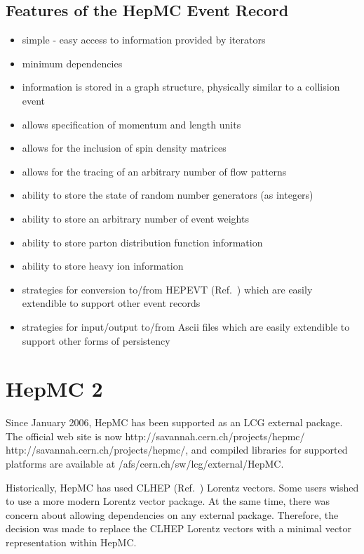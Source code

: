 \documentclass[11pt,letterpaper]{article}
\begin{document}
%
%

\subsection{Features of the HepMC Event Record}

\begin{itemize}\setlength{\itemsep}{0pt}
\item simple - easy access to information provided by iterators
\item minimum dependencies
\item information is stored in a graph structure, 
  physically similar to a collision event
\item allows specification of momentum and length units
\item allows for the inclusion of spin density matrices 
\item allows for the tracing of an arbitrary number of flow patterns
\item ability to store the state of random number generators (as
  integers)
\item ability to store an arbitrary number of event weights
\item ability to store parton distribution function information
\item ability to store heavy ion information 
\item strategies for conversion to/from HEPEVT (Ref.~\cite{Boos:2001cv}) 
  which are easily extendible to support other event records
\item strategies for input/output to/from Ascii files which
  are easily extendible to support other forms of persistency
\end{itemize}

%
%

\section{HepMC 2}

Since January 2006, HepMC has been supported as an LCG external package.
The official web site is now \htmladdnormallink 
{http://savannah.cern.ch/projects/hepmc/} 
{http://savannah.cern.ch/projects/hepmc/}, 
and compiled libraries for supported platforms are available at 
/afs/cern.ch/sw/lcg/external/HepMC.

Historically, HepMC has used CLHEP (Ref.~\cite{clhep}) Lorentz vectors.  Some users wished to use
a more modern Lorentz vector package.  At the same time, 
there was concern about allowing dependencies on any external package.  
Therefore, the decision was made to replace the CLHEP Lorentz vectors with
a minimal vector representation within HepMC.  
\end{document}
